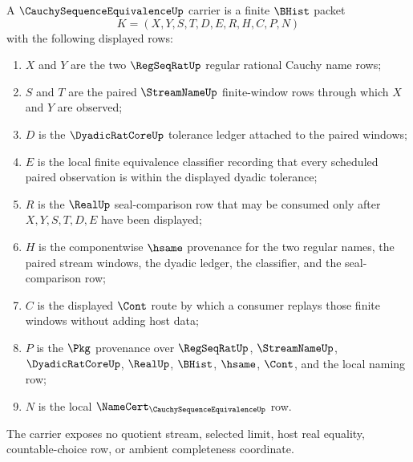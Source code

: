 \begin{definition}
\label{def:cauchysequenceequivalence-carrier-surface}
A $\CauchySequenceEquivalenceUp$ carrier is a finite $\BHist$ packet
$$
K=(X,Y,S,T,D,E,R,H,C,P,N)
$$
with the following displayed rows:
\begin{enumerate}
\item $X$ and $Y$ are the two $\RegSeqRatUp$ regular rational Cauchy name rows;
\item $S$ and $T$ are the paired $\StreamNameUp$ finite-window rows through which $X$ and $Y$ are observed;
\item $D$ is the $\DyadicRatCoreUp$ tolerance ledger attached to the paired windows;
\item $E$ is the local finite equivalence classifier recording that every scheduled paired observation is within the displayed dyadic tolerance;
\item $R$ is the $\RealUp$ seal-comparison row that may be consumed only after $X,Y,S,T,D,E$ have been displayed;
\item $H$ is the componentwise $\hsame$ provenance for the two regular names, the paired stream windows, the dyadic ledger, the classifier, and the seal-comparison row;
\item $C$ is the displayed $\Cont$ route by which a consumer replays those finite windows without adding host data;
\item $P$ is the $\Pkg$ provenance over $\RegSeqRatUp$, $\StreamNameUp$, $\DyadicRatCoreUp$, $\RealUp$, $\BHist$, $\hsame$, $\Cont$, and the local naming row;
\item $N$ is the local $\NameCert_{\CauchySequenceEquivalenceUp}$ row.
\end{enumerate}
The carrier exposes no quotient stream, selected limit, host real equality, countable-choice row, or ambient completeness coordinate.
\end{definition}

